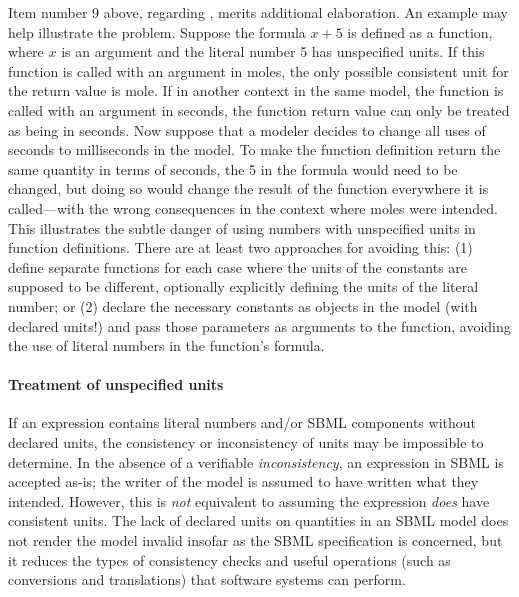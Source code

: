 Item number 9 above, regarding \FunctionDefinition,
merits additional elaboration.  An example may help illustrate
the problem.  Suppose the formula $x + 5$ is defined as a
function, where $x$ is an argument and the literal number 5
has unspecified units.  If this function is called with an
argument in moles, the only possible consistent unit for the
return value is mole.  If in another context in the same model,
the function is called with an argument in seconds, the function
return value can only be treated as being in seconds.  Now suppose
that a modeler decides to change all uses of seconds to
milliseconds in the model.  To make the function definition return
the same quantity in terms of seconds, the 5 in the formula would
need to be changed, but doing so would change the result of the
function everywhere it is called---with the wrong consequences in
the context where moles were intended.  This illustrates the
subtle danger of using numbers with unspecified units in function
definitions.  There are at least two approaches for avoiding this:
(1) define separate functions for each case where the units of the
constants are supposed to be different, optionally explicitly
defining the units of the literal number; or (2) declare the
necessary constants as \Parameter objects in the model (with
declared units!) and pass those parameters as arguments to the
function, avoiding the use of literal numbers in the function's
formula.


\paragraph{Treatment of unspecified units}

If an expression contains literal numbers and/or SBML components
without declared units, the consistency or inconsistency of units
may be impossible to determine.  In the absence of a verifiable
\emph{inconsistency}, an expression in SBML is accepted as-is; the
writer of the model is assumed to have written what they intended.
However, this is \emph{not} equivalent to assuming the expression
\emph{does} have consistent units.  The lack of declared units on
quantities in an SBML model does not render the model invalid
insofar as the SBML specification is concerned, but it reduces the
types of consistency checks and useful operations (such as
conversions and translations) that software systems can perform.

